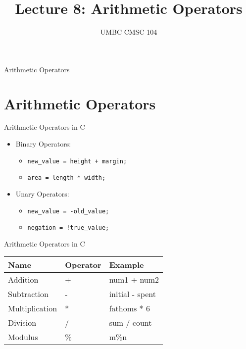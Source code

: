 \documentclass[graphics]{beamer}
\title{Lecture 8: Arithmetic Operators}
\author{UMBC CMSC 104}
\date{}
\begin{document}
\begin{frame}{}
\centering
    Arithmetic Operators
\end{frame}

\frame{\tableofcontents}

\section{Arithmetic Operators}\label{sec:athricop}
\begin{frame}{Arithmetic Operators in C}
    \begin{itemize}
        \item Binary Operators:
        \begin{itemize}
            \item \texttt{new\_value = height + margin;}
            \item \texttt{area = length * width;}
        \end{itemize}
        \item Unary Operators:
        \begin{itemize}
            \item \texttt{new\_value = -old\_value;}
            \item \texttt{negation = !true\_value;}
        \end{itemize}
    \end{itemize}
\end{frame}

\begin{frame}{Arithmetic Operators in C}
    \begin{tabular}{l l l}
        Name & Operator & Example  \\ \hline
        Addition & + & num1 + num2 \\
        Subtraction & - & initial - spent \\
        Multiplication & * & fathoms * 6 \\
        Division & / & sum / count \\
        Modulus & \% & m\%n
    \end{tabular}
\end{frame}
\end{document}

